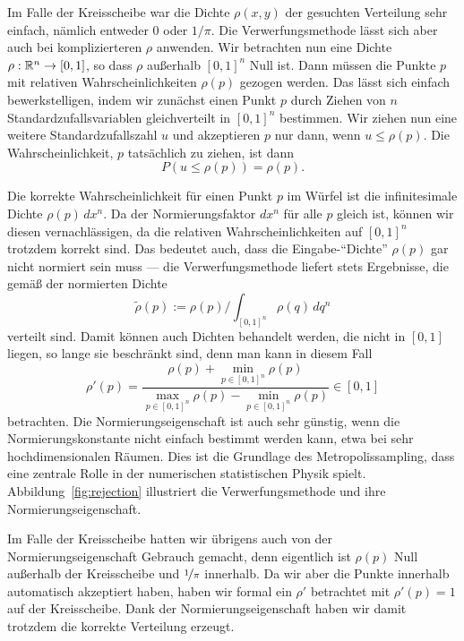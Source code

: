 Im Falle der Kreisscheibe war die Dichte $\rho(x, y)$ der gesuchten
Verteilung sehr einfach, nämlich entweder $0$ oder $1/\pi$. Die
Verwerfungsmethode lässt sich aber auch bei komplizierteren $\rho$
anwenden. Wir betrachten nun eine Dichte $\rho:\mathbb{R}^n\to [0,1]$, so
dass $\rho$ außerhalb $[0,1]^n$ Null ist. Dann müssen die Punkte $p$
mit relativen Wahrscheinlichkeiten $\rho(p)$ gezogen werden. Das lässt
sich einfach bewerkstelligen, indem wir zunächst einen Punkt $p$ durch
Ziehen von $n$ Standardzufallsvariablen gleichverteilt in $[0,1]^n$
bestimmen. Wir ziehen nun eine weitere Standardzufallszahl $u$ und
akzeptieren $p$ nur dann, wenn $u\le\rho(p)$. Die Wahrscheinlichkeit,
$p$ tatsächlich zu ziehen, ist dann
\begin{equation}
  P(u \le\rho(p)) = \rho(p).
\end{equation}

Die korrekte Wahrscheinlichkeit für einen Punkt $p$ im Würfel ist die
infinitesimale Dichte $\rho(p)\,dx^n$. Da der Normierungsfaktor $dx^n$
für alle $p$ gleich ist, können wir diesen vernachlässigen, da die
relativen Wahrscheinlichkeiten auf $[0,1]^n$ trotzdem korrekt
sind. Das bedeutet auch, dass die Eingabe-"`Dichte"' $\rho(p)$ gar nicht
normiert sein muss --- die Verwerfungsmethode liefert stets
Ergebnisse, die gemäß der normierten Dichte
\begin{equation}
  \tilde\rho(p) := \rho(p) / \int_{[0,1]^n} \rho(q)\,dq^n
\end{equation}
verteilt sind. Damit können auch Dichten behandelt werden, die nicht
in $[0,1]$ liegen, so lange sie beschränkt sind, denn man kann in
diesem Fall
\begin{equation}
  \rho'(p) = \frac{\rho(p) + \min_{p\in [0,1]^n} \rho(p)}{
    \max_{p\in [0,1]^n} \rho(p) - \min_{p\in [0,1]^n} \rho(p)} \in [0,1]
\end{equation}
betrachten. Die Normierungseigenschaft ist auch sehr günstig, wenn die
Normierungskonstante nicht einfach bestimmt werden kann, etwa bei sehr
hochdimensionalen Räumen. Dies ist die Grundlage des
Metropolissampling, dass eine zentrale Rolle in der numerischen
statistischen Physik spielt. Abbildung~\ref{fig:rejection} illustriert
die Verwerfungsmethode und ihre Normierungseigenschaft.

Im Falle der Kreisscheibe hatten wir übrigens auch von der
Normierungseigenschaft Gebrauch gemacht, denn eigentlich ist $\rho(p)$
Null außerhalb der Kreisscheibe und $\nicefrac{1}{\pi}$ innerhalb. Da
wir aber die Punkte innerhalb automatisch akzeptiert haben, haben wir
formal ein $\rho'$ betrachtet mit $\rho'(p) = 1$ auf der
Kreisscheibe. Dank der Normierungseigenschaft haben wir damit trotzdem
die korrekte Verteilung erzeugt.

